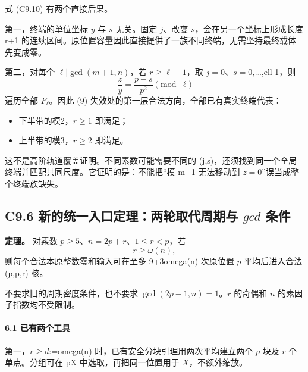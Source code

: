 {式} {(C9.10)} {有两个直接后果。}

{第一，终端的单位坐标} {\ensuremath{y}} {与} {\ensuremath{s}} {无关。固定} {\ensuremath{j}、改变} {\ensuremath{s}，会在另一个坐标上形成长度} {r+1} {的连续区间。原位置容量因此直接提供了一族不同终端，无需坚持最终载体先变成零。}

{第二，对每个} {\ensuremath{\ell |\operatorname{gcd}(m+1,n)}，若} {\ensuremath{r\ge \ell -1}，取} {\ensuremath{j=0}、\ensuremath{s=0,}\ldots,ell-1，则} \[
\frac zy=\frac{p-s}{p^2}\pmod\ell
\] {遍历全部} {\ensuremath{F_\ell }。因此} {(9)} {失效处的第一层合法方向，全部已有真实终端代表：}

\begin{itemize}
\tightlist
\item
  {下半带的模2，\ensuremath{r\ge 1}} {即满足；}
\item
  {上半带的模3，\ensuremath{r\ge 2}} {即满足。}
\end{itemize}

{这不是高阶轨道覆盖证明。不同素数可能需要不同的} {(j,s)，还须找到同一个全局终端并匹配共同尺度。它证明的是：不能把``模} {m+1} {无法移动到} {\ensuremath{z=0}''误当成整个终端族缺失。}

\subsection*{\texorpdfstring{{C9.6} {新的统一入口定理：两轮取代周期与} {\ensuremath{gcd}} {条件}}{C9.6 新的统一入口定理：两轮取代周期与  条件}}\label{C9-h65}

\textbf{{定理。}} {对素数} {\ensuremath{p\ge 5}、\ensuremath{n=2p+r}、\ensuremath{1\le r<p}，若} \[
\boxed{r\ge\omega(n),}
\tag{C9.13}
\] {则每个合法本原整数零和输入可在至多} {9+3omega(n)} {次原位置} {\ensuremath{p}} {平均后进入合法} {(p,p,r)} {核。}

{不要求旧的周期密度条件，也不要求} {\ensuremath{\operatorname{gcd}(2p-1,n)=1}。\ensuremath{r}} {的奇偶和} {\ensuremath{n}} {的素因子指数均不受限制。}

\paragraph*{\texorpdfstring{{6.1} {已有两个工具}}{6.1 已有两个工具}}\label{C9-h66}

{第一，\ensuremath{r\ge d}:=omega(n)} {时，已有安全分块引理用两次平均建立两个} {\ensuremath{p}} {块及} {\ensuremath{r}} {个单点。分组可在} {pX} {中选取，再把同一位置用于} {\ensuremath{X}，不额外缩放。}

